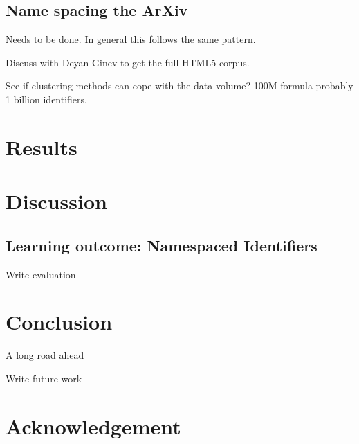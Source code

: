 \documentclass{sig-alternate-2013}
\begin{document}
\subsection{Name spacing the ArXiv}
Needs to be done. In general this follows the same pattern.

Discuss with Deyan Ginev to get the full HTML5 corpus.

See if clustering methods can cope with the data volume? 100M formula probably 1 billion identifiers.
\section{Results}
\section{Discussion}
\subsection{Learning outcome: Namespaced Identifiers}
Write evaluation

\section{Conclusion}

A long road ahead

Write future work
\section{Acknowledgement}
\end{document}

